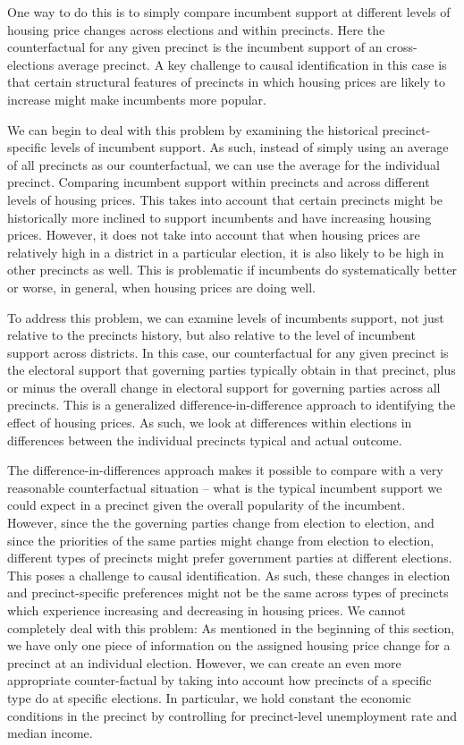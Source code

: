 \documentclass[12pt,a4paper]{article}
\begin{document}
			One way to do this is to simply compare incumbent support at different levels of housing price changes across elections and within precincts. Here the counterfactual for any given precinct is the incumbent support of an cross-elections average precinct. A key challenge to causal identification in this case is that certain structural features of precincts in which housing prices are likely to increase might make incumbents more popular.
			
			We can begin to deal with this problem by examining the historical precinct-specific levels of incumbent support. As such, instead of simply using an average of all precincts as our counterfactual, we can use the average for the individual precinct. Comparing incumbent support within precincts and across different levels of housing prices. This takes into account that certain precincts might be historically more inclined to support incumbents and have increasing housing prices. However, it does not take into account that when housing prices are relatively high in a district in a particular election, it is also likely to be high in other precincts as well. This is problematic if incumbents do systematically better or worse, in general, when housing prices are doing well.
			
			To address this problem, we can examine levels of incumbents support, not just relative to the precincts history, but also relative to the level of incumbent support across districts. In this case, our counterfactual for any given precinct is the electoral support that governing parties typically obtain in that precinct, plus or minus the overall change in electoral support for governing parties across all precincts. This is a generalized difference-in-difference approach to identifying the effect of housing prices. As such, we look at differences within elections in differences between the individual precincts typical and actual outcome.
			
			The difference-in-differences approach makes it possible to compare with a very reasonable counterfactual situation -- what is the typical incumbent support we could expect in a precinct given the overall popularity of the incumbent. However, since the the governing parties change from election to election, and since the priorities of the same parties might change from election to election, different types of precincts might prefer government parties at  different elections. This poses a challenge to causal identification. As such,  these changes in election and precinct-specific preferences might not be the same across types of precincts which experience increasing and decreasing in housing prices. We cannot completely deal with this problem: As mentioned in the beginning of this section, we have only one piece of information on the assigned housing price change for a precinct at an individual election. However, we can create an even more appropriate counter-factual by taking into account how precincts of a specific type do at specific elections. In particular, we hold constant the economic conditions in the precinct by controlling for precinct-level unemployment rate and median income.
			
\end{document}

